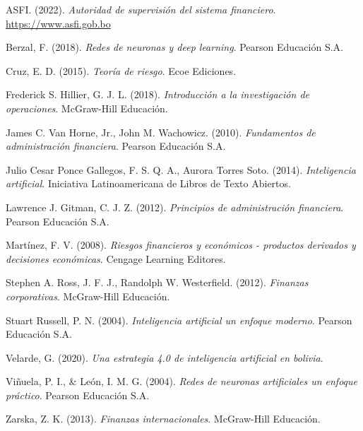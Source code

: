 \documentclass[
  12pt,
]{article}
\newlength{\cslhangindent}
\newlength{\cslentryspacingunit} %
\newenvironment{CSLReferences}[2] %
 {%
  \setlength{\parindent}{0pt}
  \ifodd #1
  \let\oldpar\par
  \def\par{\hangindent=\cslhangindent\oldpar}
  \fi
  \setlength{\parskip}{#2\cslentryspacingunit}
 }%
 {}
\begin{document}
\hypertarget{refs}{}
\begin{CSLReferences}{1}{0}
\leavevmode{}%
ASFI. (2022). \emph{Autoridad de supervisión del sistema financiero}.
\url{https://www.asfi.gob.bo}

\leavevmode{}%
Berzal, F. (2018). \emph{Redes de neuronas y deep learning}. Pearson
Educación S.A.

\leavevmode{}%
Cruz, E. D. (2015). \emph{Teoría de riesgo}. Ecoe Ediciones.

\leavevmode{}%
Frederick S. Hillier, G. J. L. (2018). \emph{Introducción a la
investigación de operaciones}. McGraw-Hill Educación.

\leavevmode{}%
James C. Van Horne, Jr., John M. Wachowicz. (2010). \emph{Fundamentos de
administración financiera}. Pearson Educación S.A.

\leavevmode{}%
Julio Cesar Ponce Gallegos, F. S. Q. A., Aurora Torres Soto. (2014).
\emph{Inteligencia artificial}. Iniciativa Latinoamericana de Libros de
Texto Abiertos.

\leavevmode{}%
Lawrence J. Gitman, C. J. Z. (2012). \emph{Principios de administración
financiera}. Pearson Educación S.A.

\leavevmode{}%
Martínez, F. V. (2008). \emph{Riesgos financieros y económicos -
productos derivados y decisiones económicas}. Cengage Learning Editores.

\leavevmode{}%
Stephen A. Ross, J. F. J., Randolph W. Westerfield. (2012).
\emph{Finanzas corporativas}. McGraw-Hill Educación.

\leavevmode{}%
Stuart Russell, P. N. (2004). \emph{Inteligencia artificial un enfoque
moderno}. Pearson Educación S.A.

\leavevmode{}%
Velarde, G. (2020). \emph{Una estrategia 4.0 de inteligencia artificial
en bolivia}.

\leavevmode{}%
Viñuela, P. I., \& León, I. M. G. (2004). \emph{Redes de neuronas
artificiales un enfoque práctico}. Pearson Educación S.A.

\leavevmode{}%
Zarska, Z. K. (2013). \emph{Finanzas internacionales}. McGraw-Hill
Educación.

\end{CSLReferences}
\end{document}
